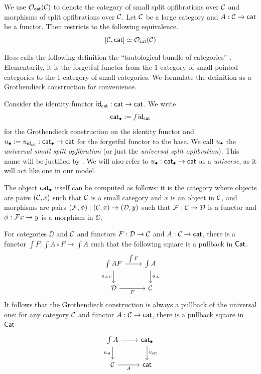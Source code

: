 We use ${\mathcal{O}}_{\mathsf{cat}}(\mathcal{C})$ to denote the category
of small split opfibrations over $\mathcal{C}$
and morphisms of split opfibrations over $\mathcal{C}$.
Let $\mathcal{C}$ be a large category and
$A : \mathcal{C} \to \mathsf{cat}$ be a functor.
Then 
restricts to the following equivalence.
\[[\mathcal{C},\mathsf{cat}] \simeq {\mathcal{O}}_{\mathsf{cat}}(\mathcal{C})\] 

Hess calls the following definition the
``tautological bundle of categories'' \cite{hess2007}.
Elementarily,
it is the forgetful functor from the 1-category of small pointed categories
to the 1-category of small categories.
We formulate the definition as a Grothendieck construction for convenience.

\begin{definition}\label{def:universal-small-split-opfibration}
  Consider the identity functor $\mathsf{id}_{\mathsf{cat}} : \mathsf{cat} \to \mathsf{cat}$.
  We write \[\mathsf{cat}_\bullet := \smallint \mathsf{id}_{\mathsf{cat}}\] for the Grothendieck construction
  on the identity functor
  and ${u_\bullet} := u_{\mathsf{id}_{\mathsf{cat}}} : \mathsf{cat}_\bullet \to \mathsf{cat}$ for the forgetful functor to the base.
  We call 
  ${u_\bullet}$ the \emph{universal small split opfibration}
  (or just the \emph{universal split opfibration}).
  This name will be justified by .
  We will also refer to ${u_\bullet} : \mathsf{cat}_\bullet \to \mathsf{cat}$ as a \emph{universe},
  as it will act like one in our model.
\end{definition}

The object $\mathsf{cat}_\bullet$ itself can be computed as follows:
it is the category where objects are pairs $(\mathcal{C},x)$ such that
$\mathcal{C}$ is a small category and $x$ is an object in $\mathcal{C}$,
and morphisms are pairs $(\mathcal{F},\phi) : (\mathcal{C},x) \to (\mathcal{D},y)$
such that $\mathcal{F} : \mathcal{C} \to \mathcal{D}$ is a functor
and $\phi : \mathcal{F} x \to y$ is a morphism in $\DD$.

For categories $\DD$ and $\mathcal{C}$ and functors
$F : \mathcal{D} \to \mathcal{C}$ and $A : \mathcal{C} \to \mathsf{cat}$,
there is a functor
$\int F : \int A \circ F \to \int A$
such that the following square is a pullback in $\mathsf{Cat}$.
\[
\begin{tikzcd}
  {\int A F} & {\int A} \\
  \DD & \CC 
  \arrow["{\int F}", from=1-1, to=1-2]
  \arrow["{u_{A F}}"', from=1-1, to=2-1]
  \arrow["{u_A}", from=1-2, to=2-2]
  \arrow["F"', from=2-1, to=2-2]
\end{tikzcd}
\]
It follows that the Grothendieck construction
is always a pullback of the universal one:
for any category $\mathcal{C}$ and functor $A : \mathcal{C} \to \mathsf{cat}$,
there is a pullback square in $\mathsf{Cat}$
\[
  \begin{tikzcd}
    {\int A} & {\pcat} \\
    \CC & \cat
    \arrow[from=1-1, to=1-2]
    \arrow["u_A"', from=1-1, to=2-1]
    \arrow["u_\cat", from=1-2, to=2-2]
    \arrow["A"', from=2-1, to=2-2]
  \end{tikzcd}
\]

